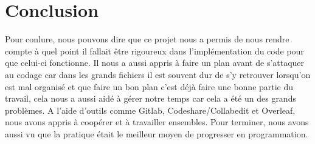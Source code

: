 \documentclass[a4paper, 11pt, oneside]{article}
\begin{document}
\section{Conclusion}
Pour conlure, nous pouvons dire que ce projet nous a permis de nous rendre compte à quel point il fallait être rigoureux dans l'implémentation du code pour que celui-ci fonctionne. Il nous a aussi appris à faire un plan avant de s'attaquer au codage car dans les grands fichiers il est souvent dur de s'y retrouver lorsqu'on est mal organisé et que faire un bon plan c'est déjà faire une bonne partie du travail, cela nous a aussi aidé à gérer notre temps car cela a été un des grands problèmes. A l'aide d'outils comme Gitlab, Codeshare/Collabedit et Overleaf, nous avons appris à coopérer et à travailler ensembles. Pour terminer, nous avons aussi vu que la pratique était le meilleur moyen de progresser en programmation.
\end{document}
